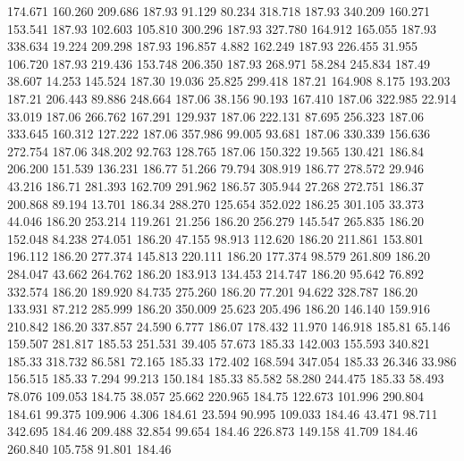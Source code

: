  174.671  160.260  209.686       187.93
  91.129   80.234  318.718       187.93
 340.209  160.271  153.541       187.93
 102.603  105.810  300.296       187.93
 327.780  164.912  165.055       187.93
 338.634   19.224  209.298       187.93
 196.857    4.882  162.249       187.93
 226.455   31.955  106.720       187.93
 219.436  153.748  206.350       187.93
 268.971   58.284  245.834       187.49
  38.607   14.253  145.524       187.30
  19.036   25.825  299.418       187.21
 164.908    8.175  193.203       187.21
 206.443   89.886  248.664       187.06
  38.156   90.193  167.410       187.06
 322.985   22.914   33.019       187.06
 266.762  167.291  129.937       187.06
 222.131   87.695  256.323       187.06
 333.645  160.312  127.222       187.06
 357.986   99.005   93.681       187.06
 330.339  156.636  272.754       187.06
 348.202   92.763  128.765       187.06
 150.322   19.565  130.421       186.84
 206.200  151.539  136.231       186.77
  51.266   79.794  308.919       186.77
 278.572   29.946   43.216       186.71
 281.393  162.709  291.962       186.57
 305.944   27.268  272.751       186.37
 200.868   89.194   13.701       186.34
 288.270  125.654  352.022       186.25
 301.105   33.373   44.046       186.20
 253.214  119.261   21.256       186.20
 256.279  145.547  265.835       186.20
 152.048   84.238  274.051       186.20
  47.155   98.913  112.620       186.20
 211.861  153.801  196.112       186.20
 277.374  145.813  220.111       186.20
 177.374   98.579  261.809       186.20
 284.047   43.662  264.762       186.20
 183.913  134.453  214.747       186.20
  95.642   76.892  332.574       186.20
 189.920   84.735  275.260       186.20
  77.201   94.622  328.787       186.20
 133.931   87.212  285.999       186.20
 350.009   25.623  205.496       186.20
 146.140  159.916  210.842       186.20
 337.857   24.590    6.777       186.07
 178.432   11.970  146.918       185.81
  65.146  159.507  281.817       185.53
 251.531   39.405   57.673       185.33
 142.003  155.593  340.821       185.33
 318.732   86.581   72.165       185.33
 172.402  168.594  347.054       185.33
  26.346   33.986  156.515       185.33
   7.294   99.213  150.184       185.33
  85.582   58.280  244.475       185.33
  58.493   78.076  109.053       184.75
  38.057   25.662  220.965       184.75
 122.673  101.996  290.804       184.61
  99.375  109.906    4.306       184.61
  23.594   90.995  109.033       184.46
  43.471   98.711  342.695       184.46
 209.488   32.854   99.654       184.46
 226.873  149.158   41.709       184.46
 260.840  105.758   91.801       184.46
